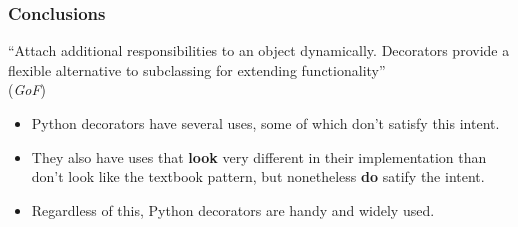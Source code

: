 \documentclass[10pt]{beamer}
\begin{document}
\begin{frame}
  \frametitle{Conclusions}
  
  ``Attach additional responsibilities to an object dynamically. Decorators
  provide a flexible alternative to subclassing for extending functionality'' \\
  (\emph{GoF})

  \begin{itemize}
    \item Python decorators have several uses, some of which don't satisfy this intent.
    \item They also have uses that \textbf{look} very different in their implementation than don't
    look like the textbook pattern, but nonetheless \textbf{do} satify the intent.
    \item Regardless of this, Python decorators are handy and widely used.
  \end{itemize}
\end{frame}
\end{document}

